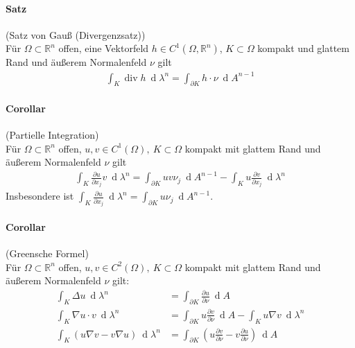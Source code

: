 \documentclass[12pt,a4paper,fleqn]{article}
\def\R{{\mathbb{R}}}
\def\d{{\operatorname{d}}}
\begin{document}
\paragraph{Satz} (Satz von Gauß (Divergenzsatz))\\
Für $\Omega \subset \R^n$ offen, eine Vektorfeld $h \in C^1(\Omega, \R^n)$, $K\subset \Omega$ kompakt und glattem Rand und äußerem Normalenfeld $\nu$ gilt
\begin{align*}
\int_K \operatorname{div} h\ \d\lambda^n = \int_{\partial K} h \cdot \nu\ \d A^{n-1}
\end{align*}

\paragraph{Corollar} (Partielle Integration)\\
Für $\Omega \subset \R^n$ offen, $u, v \in C^1(\Omega),\ K\subset\Omega$ kompakt mit glattem Rand und äußerem Normalenfeld $\nu$ gilt
\begin{align*}
\int_K\frac{\partial u}{\partial x_j} v\ \d\lambda^n = \int_{\partial K} uv\nu_j\ \d A^{n-1} - \int_K u\frac{\partial v}{\partial x_j}\ \d\lambda^n
\end{align*}
Insbesondere ist $\int_K \frac{\partial u}{\partial x_j}\ \d\lambda^n = \int_{\partial K} u\nu_j\ \d A^{n-1}$.

\paragraph{Corollar} (Greensche Formel)\\
Für $\Omega \subset \R^n$ offen, $u, v \in C^2(\Omega),\ K\subset \Omega$ kompakt mit glattem Rand und äußerem Normalenfeld $\nu$ gilt:
\begin{align*}
\int_K  \Delta u\ \d\lambda^n &= \int_{\partial K} \frac{\partial u}{\partial \nu}\ \d A\\
\int_K \nabla u \cdot v\ \d\lambda^n &= \int_{\partial K} u\frac{\partial v}{\partial \nu}\ \d A - \int_K u\nabla v\ \d\lambda^n\\
\int_K(u\nabla v - v\nabla u)\ \d\lambda^n &= \int_{\partial K} \left(u\frac{\partial v}{\partial \nu} - v\frac{\partial u}{\partial \nu}\right)\ \d A
\end{align*}
\end{document}
